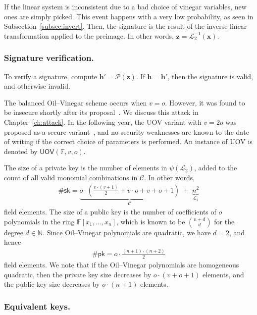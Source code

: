 \documentclass[english]{ufsc-thesis-rn46-2019/ufsc-thesis-rn46-2019}
\theoremstyle{definition}
\begin{document}
If the linear system is inconsistent due to a bad choice of vinegar variables,
new ones are simply picked. This event happens with a very low probability, as
seen in Subsection~\ref{subsec:invert}. Then, the signature is the result of
the inverse linear transformation applied to the preimage. In other words,
$\mathbf{z} = \mathcal{L}_{2}^{-1}(\mathbf{x})$.

\subsubsection{Signature verification.}

To verify a signature, compute $\mathbf{h'} = \mathcal{P}(\mathbf{z})$. If
$\mathbf{h} = \mathbf{h'}$, then the signature is valid, and otherwise invalid.

The balanced Oil--Vinegar scheme occurs when $v = o$. However, it was found to
be insecure shortly after its proposal~\cite{Kipnis:199808}. We discuss this
attack in Chapter~\ref{ch:attack}. In the following year, the UOV variant with
$v = 2o$ was proposed as a secure variant~\cite{Kipnis:199904}, and no security
weaknesses are known to the date of writing if the correct choice of parameters
is performed. An instance of UOV is denoted by
$\mathsf{UOV}(\mathbb{F}, v, o)$.

The size of a private key is the number of elements in $\psi(\mathcal{L}_{2})$,
added to the count of all valid monomial combinations in $\mathcal{C}$. In
other words,
\begin{align}
  \#\mathsf{sk} = \underbrace{o \cdot \left(
    \frac{v \cdot (v + 1)}{2} + v \cdot o + v + o + 1
  \right)}_{\mathcal{C}} \; + \; \underbrace{n^{2}}_{\mathcal{L}_{2}}
\end{align}
field elements. The size of a public key is the number of coefficients of $o$
polynomials in the ring $\mathbb{F}[x_{1}, \dots, x_{n}]$, which is known to be
$\binom{n + d}{d}$ for the degree $d \in \mathbb{N}$. Since Oil--Vinegar
polynomials are quadratic, we have $d = 2$, and hence
\begin{align}
  \#\mathsf{pk} = o \cdot \frac{(n + 1) \cdot (n + 2)}{2}
\end{align}
field elements. We note that if the Oil--Vinegar polynomials are homogeneous
quadratic, then the private key size decreases by $o \cdot (v + o + 1)$
elements, and the public key size decreases by $o \cdot (n + 1)$ elements.

\subsubsection{Equivalent keys.}
\end{document}
